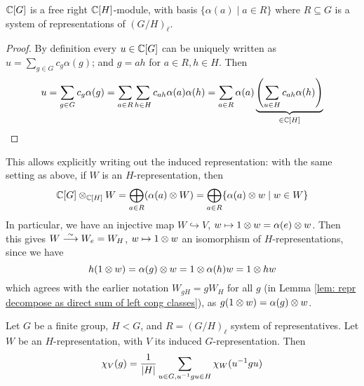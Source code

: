 \begin{claim}
    $\mathbb{C}[G]$ is a free right $\mathbb{C}[H]$-module, with basis $\{ \alpha(a) \mid a \in R \}$ where $R \subseteq G$ is a system of representations of $(G/H)_{\ell}$.
\end{claim}

\begin{proof}
    By definition every $u \in \mathbb{C}[G]$ can be uniquely written as $u = \sum_{g \in G} c_g \alpha(g)$; and $g = ah$ for $a \in R, h \in H$. Then
    \[
        u = \sum_{g \in G} c_g \alpha(g) = \sum_{a \in R} \sum_{h \in H} c_{ah} \alpha(a) \alpha(h) = \sum_{a \in R} \alpha(a) \underbrace{\left( \sum_{u \in H} c_{ah} \alpha(h) \right)}_{\in \mathbb{C}[H]}
    \]
\end{proof}

This allows explicitly writing out the induced representation: with the same setting as above, if $W$ is an $H$-representation, then 
\[
    \mathbb{C}[G] \otimes_{\mathbb{C}[H]} W = \bigoplus_{a \in R} (\alpha(a) \otimes W) = \bigoplus_{a \in R} \{ \alpha(a) \otimes w \mid w \in W \}
\]
In particular, we have an injective map $W \hookrightarrow V$, $w \mapsto 1 \otimes w = \alpha(e) \otimes w$. Then this gives $W \overset{\sim}{\longrightarrow} W_e = W_H$, $w \mapsto 1 \otimes w$ an isomorphism of $H$-representations, since we have
\[
    h (1 \otimes w) = \alpha(g) \otimes w = 1 \otimes \alpha(h) w = 1 \otimes hw
\]
which agrees with the earlier notation $W_{gH} = g W_H$ for all $g$ (in Lemma \ref{lem: repr decompose as direct sum of left cong classes}), as $g(1 \otimes w) = \alpha(g) \otimes w$.

\begin{proposition}\label{prop: induced character}
    Let $G$ be a finite group, $H < G$, and $R = (G/H)_{\ell}$ system of representatives. Let $W$ be an $H$-representation, with $V$ its induced $G$-representation. Then
    \[
        \chi_V (g) = \frac{1}{\left|H\right|} \sum_{u \in G, u^{-1}gu \in H} \chi_W (u^{-1} g u)
    \]
\end{proposition}

